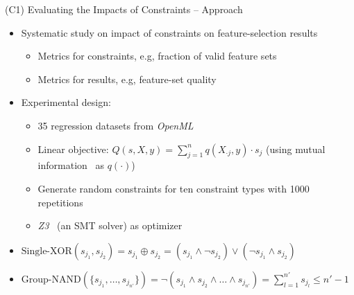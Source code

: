 \documentclass[en, navbarinline, handout]{sdqbeamer}
\begin{document}
\begin{frame}[t]{(C1) Evaluating the Impacts of Constraints -- Approach}
	\begin{itemize}
		\item Systematic study on impact of constraints on feature-selection results
		\begin{itemize}
			\item Metrics for constraints, e.g, fraction of valid feature sets
			\item Metrics for results, e.g, feature-set quality
		\end{itemize}
		\pause
		\vspace{\baselineskip}
		\item Experimental design:
		\begin{itemize}
			\item 35 regression datasets from \emph{OpenML}~\cite{vanschoren2014openml}
			\item Linear objective: $Q(s,X,y) = \sum_{j=1}^{n} q(X_{\cdot{}j},y) \cdot s_j$ (using mutual information~\cite{kraskov2004estimating} as $q(\cdot)$)
			\item Generate random constraints for ten constraint types with 1000 repetitions
			\item \emph{Z3}~\cite{bjorner2015nuz, deMoura2008z3} (an SMT solver) as optimizer
		\end{itemize}
	\end{itemize}
	\pause
	\vspace{\baselineskip}
	\begin{examples}
		\begin{itemize}
			\item $\text{Single-XOR}(s_{j_1}, s_{j_2}) = s_{j_1} \oplus s_{j_2} = (s_{j_1} \land \lnot s_{j_2}) \lor (\lnot s_{j_1} \land s_{j_2})$
			\item $\text{Group-NAND}(\{s_{j_1}, \dots, s_{j_{n'}}\}) =	\lnot (s_{j_1} \land s_{j_2} \land \dots \land s_{j_{n'}}) = \sum_{l=1}^{n'} s_{j_l} \leq n'-1$
		\end{itemize}
	\end{examples}
\end{frame}
\end{document}

